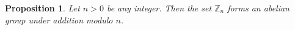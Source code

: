 \documentclass[10pt, titlepage]{amsart}
\newcommand\Z{{\mathbb Z}}
\newtheorem{theorem}{Theorem}[subsection]
\newtheorem{prop}{Proposition}[subsection]
\theoremstyle{definition}
\newtheorem{definition}{Definition}[subsection]
\begin{document}
	
%	
	
	
	

	
	\begin{prop}\label{proposition:Zn_is_an_abelian_group_under_addition}
		Let $n>0$ be any integer. Then the set $\Z_n$ forms an abelian group under addition modulo $n$.
	\end{prop}
	
\end{document}
